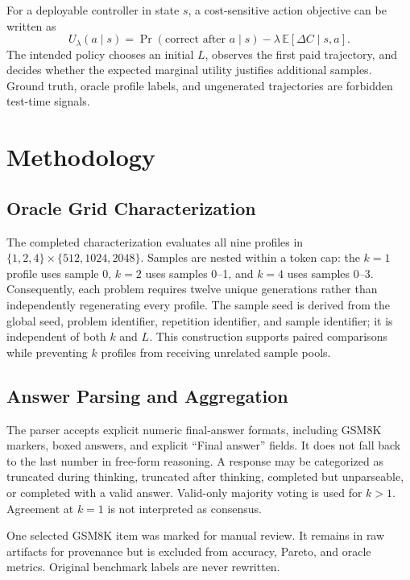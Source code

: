 \documentclass[runningheads]{llncs}
\begin{document}
For a deployable controller in state $s$, a cost-sensitive action objective can
be written as
\begin{equation}
 U_{\lambda}(a\mid s)=
 \Pr(\text{correct after }a\mid s)
 -\lambda\,\mathbb{E}[\Delta C\mid s,a].
\end{equation}
The intended policy chooses an initial $L$, observes the first paid trajectory,
and decides whether the expected marginal utility justifies additional
samples. Ground truth, oracle profile labels, and ungenerated trajectories are
forbidden test-time signals.

\section{Methodology}

\subsection{Oracle Grid Characterization}

The completed characterization evaluates all nine profiles in
$\{1,2,4\}\times\{512,1024,2048\}$. Samples are nested within a token cap:
the $k=1$ profile uses sample 0, $k=2$ uses samples 0--1, and $k=4$ uses samples
0--3. Consequently, each problem requires twelve unique generations rather
than independently regenerating every profile. The sample seed is derived from
the global seed, problem identifier, repetition identifier, and sample
identifier; it is independent of both $k$ and $L$. This construction supports
paired comparisons while preventing $k$ profiles from receiving unrelated
sample pools.

\subsection{Answer Parsing and Aggregation}

The parser accepts explicit numeric final-answer formats, including GSM8K
markers, boxed answers, and explicit ``Final answer'' fields. It does not fall
back to the last number in free-form reasoning. A response may be categorized
as truncated during thinking, truncated after thinking, completed but
unparseable, or completed with a valid answer. Valid-only majority voting is
used for $k>1$. Agreement at $k=1$ is not interpreted as consensus.

One selected GSM8K item was marked for manual review. It remains in raw
artifacts for provenance but is excluded from accuracy, Pareto, and oracle
metrics. Original benchmark labels are never rewritten.
\end{document}
